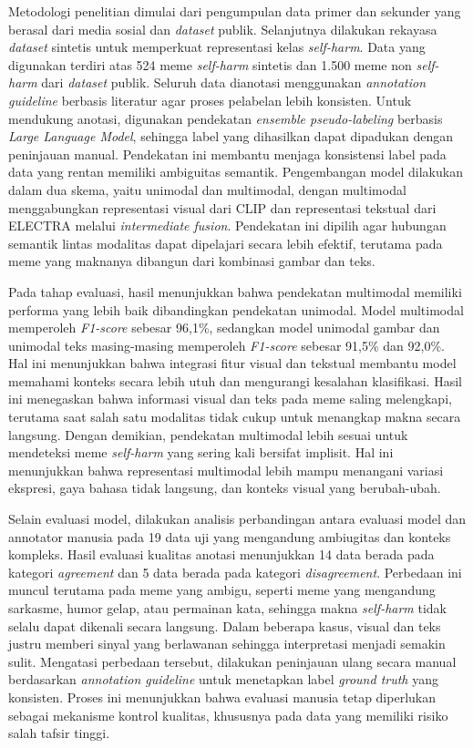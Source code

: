 \begin{center}
	 Metodologi penelitian dimulai dari pengumpulan data primer dan sekunder yang berasal dari media sosial dan \textit{dataset} publik. Selanjutnya dilakukan rekayasa \textit{dataset} sintetis untuk memperkuat representasi kelas \textit{self-harm}. Data yang digunakan terdiri atas 524 meme \textit{self-harm} sintetis dan 1.500 meme non \textit{self-harm} dari \textit{dataset} publik. Seluruh data dianotasi menggunakan \textit{annotation guideline} berbasis literatur agar proses pelabelan lebih konsisten. Untuk mendukung anotasi, digunakan pendekatan \textit{ensemble pseudo-labeling} berbasis \textit{Large Language Model}, sehingga label yang dihasilkan dapat dipadukan dengan peninjauan manual. Pendekatan ini membantu menjaga konsistensi label pada data yang rentan memiliki ambiguitas semantik. Pengembangan model dilakukan dalam dua skema, yaitu unimodal dan multimodal, dengan multimodal menggabungkan representasi visual dari CLIP dan representasi tekstual dari ELECTRA melalui \textit{intermediate fusion}. Pendekatan ini dipilih agar hubungan semantik lintas modalitas dapat dipelajari secara lebih efektif, terutama pada meme yang maknanya dibangun dari kombinasi gambar dan teks.
	 
	 Pada tahap evaluasi, hasil menunjukkan bahwa pendekatan multimodal memiliki performa yang lebih baik dibandingkan pendekatan unimodal. Model multimodal memperoleh \textit{F1-score} sebesar 96,1\%, sedangkan model unimodal gambar dan unimodal teks masing-masing memperoleh \textit{F1-score} sebesar 91,5\% dan 92,0\%. Hal ini menunjukkan bahwa integrasi fitur visual dan tekstual membantu model memahami konteks secara lebih utuh dan mengurangi kesalahan klasifikasi. Hasil ini menegaskan bahwa informasi visual dan teks pada meme saling melengkapi, terutama saat salah satu modalitas tidak cukup untuk menangkap makna secara langsung. Dengan demikian, pendekatan multimodal lebih sesuai untuk mendeteksi meme \textit{self-harm} yang sering kali bersifat implisit. Hal ini menunjukkan bahwa representasi multimodal lebih mampu menangani variasi ekspresi, gaya bahasa tidak langsung, dan konteks visual yang berubah-ubah.

	Selain evaluasi model, dilakukan analisis perbandingan antara evaluasi model dan annotator manusia pada 19 data uji yang mengandung ambiugitas dan konteks kompleks. Hasil evaluasi kualitas anotasi menunjukkan 14 data berada pada kategori \textit{agreement} dan 5 data berada pada kategori \textit{disagreement}. Perbedaan ini muncul terutama pada meme yang ambigu, seperti meme yang mengandung sarkasme, humor gelap, atau permainan kata, sehingga makna \textit{self-harm} tidak selalu dapat dikenali secara langsung. Dalam beberapa kasus, visual dan teks justru memberi sinyal yang berlawanan sehingga interpretasi menjadi semakin sulit. Mengatasi perbedaan tersebut, dilakukan peninjauan ulang secara manual berdasarkan \textit{annotation guideline} untuk menetapkan label \textit{ground truth} yang konsisten. Proses ini menunjukkan bahwa evaluasi manusia tetap diperlukan sebagai mekanisme kontrol kualitas, khususnya pada data yang memiliki risiko salah tafsir tinggi.


\end{center}
